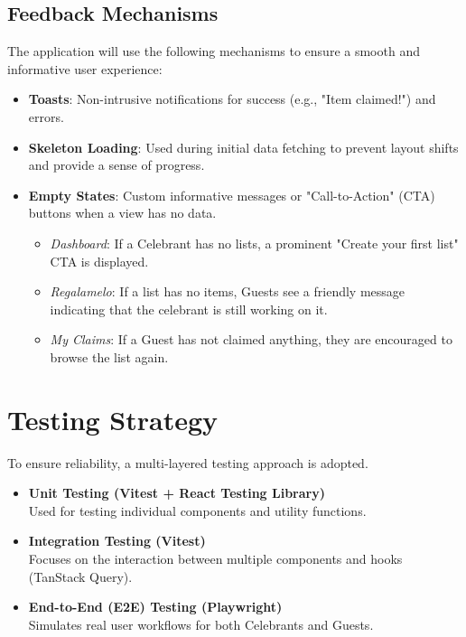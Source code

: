 \subsection{Feedback Mechanisms}
The application will use the following mechanisms to ensure a smooth and informative user experience:
\begin{itemize}
    \item \textbf{Toasts}: Non-intrusive notifications for success (e.g., "Item claimed!") and errors.
    \item \textbf{Skeleton Loading}: Used during initial data fetching to prevent layout shifts and provide a sense of progress.
    \item \textbf{Empty States}: Custom informative messages or "Call-to-Action" (CTA) buttons when a view has no data.
    \begin{itemize}
        \item \textit{Dashboard}: If a Celebrant has no lists, a prominent "Create your first list" CTA is displayed.
        \item \textit{Regalamelo}: If a list has no items, Guests see a friendly message indicating that the celebrant is still working on it.
        \item \textit{My Claims}: If a Guest has not claimed anything, they are encouraged to browse the list again.
    \end{itemize}
\end{itemize}

\section{Testing Strategy}
To ensure reliability, a multi-layered testing approach is adopted.

\begin{itemize}
    \item \textbf{Unit Testing (Vitest + React Testing Library)} \\
        Used for testing individual components and utility functions.
    \item \textbf{Integration Testing (Vitest)} \\
        Focuses on the interaction between multiple components and hooks (TanStack Query).
    \item \textbf{End-to-End (E2E) Testing (Playwright)} \\
        Simulates real user workflows for both Celebrants and Guests.
\end{itemize}

